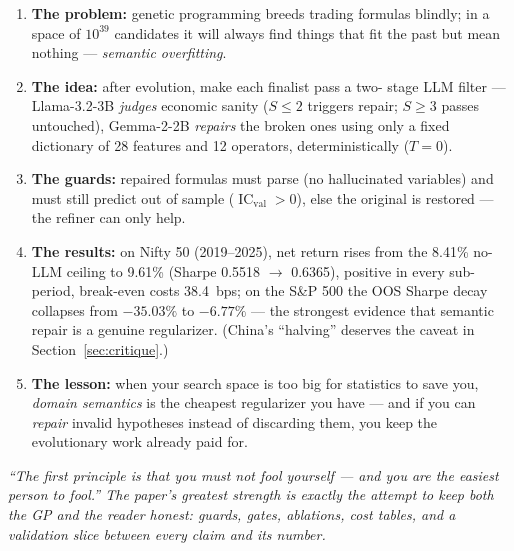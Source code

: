 \documentclass[11pt,a4paper]{article}
\begin{document}
\begin{plaineng}
\begin{enumerate}
  \item \textbf{The problem:} genetic programming breeds trading formulas
  blindly; in a space of $10^{39}$ candidates it will always find things that
  fit the past but mean nothing --- \emph{semantic overfitting}.
  \item \textbf{The idea:} after evolution, make each finalist pass a two-
  stage LLM filter --- Llama-3.2-3B \emph{judges} economic sanity
  ($S \le 2$ triggers repair; $S \ge 3$ passes untouched), Gemma-2-2B
  \emph{repairs} the broken ones using only a fixed dictionary of 28 features
  and 12 operators, deterministically ($T=0$).
  \item \textbf{The guards:} repaired formulas must parse (no hallucinated
  variables) and must still predict out of sample ($\operatorname{IC}_{\text{val}}
  > 0$), else the original is restored --- the refiner can only help.
  \item \textbf{The results:} on Nifty 50 (2019--2025), net return rises from
  the 8.41\% no-LLM ceiling to 9.61\% (Sharpe 0.5518 $\to$ 0.6365), positive
  in every sub-period, break-even costs 38.4~bps; on the S\&P 500 the OOS
  Sharpe decay collapses from $-35.03\%$ to $-6.77\%$ --- the strongest
  evidence that semantic repair is a genuine regularizer. (China's
  ``halving'' deserves the caveat in Section~\ref{sec:critique}.)
  \item \textbf{The lesson:} when your search space is too big for statistics
  to save you, \emph{domain semantics} is the cheapest regularizer you have
  --- and if you can \emph{repair} invalid hypotheses instead of discarding
  them, you keep the evolutionary work already paid for.
\end{enumerate}
\end{plaineng}

\begin{center}
\colorbox{feynlight}{\parbox{0.92\linewidth}{\centering\small\itshape
``The first principle is that you must not fool yourself --- and you are the
easiest person to fool.'' The paper's greatest strength is exactly the
attempt to keep both the GP and the reader honest: guards, gates, ablations,
cost tables, and a validation slice between every claim and its number.}}
\end{center}
\end{document}
